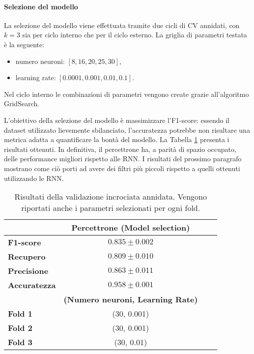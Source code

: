 \documentclass[../../main.tex]{subfiles}
\begin{document}
    \paragraph{Selezione del modello}

    La selezione del modello viene effettuata tramite due cicli di CV annidati, con $k = 3$ sia per ciclo interno che per il ciclo esterno. La griglia di parametri testata è la seguente:
    \begin{itemize}
        \item numero neuroni: $[8, 16, 20, 25, 30]$,
        \item learning rate: $[0.0001, 0.001, 0.01, 0.1]$.
    \end{itemize}

    Nel ciclo interno le combinazioni di parametri vengono create grazie all'algoritmo GridSearch.

    L'obiettivo della selezione del modello è massimizzare l'F1-score: essendo il dataset utilizzato lievemente sbilanciato, l'accuratezza potrebbe non risultare una metrica adatta a quantificare la bontà del modello. La Tabella \ref{tab:modelSelection} presenta i risultati ottenuti. In definitiva, il percettrone ha, a parità di spazio occupato, delle performance migliori rispetto alle RNN. I risultati del prossimo paragrafo mostrano come ciò porti ad avere dei filtri più piccoli rispetto a quelli ottenuti utilizzando le RNN.
    \begin{table}[H]
        \centering                  
        \begin{tabular}{lccc}
            \toprule
            {}  &   \textbf{Percettrone (Model selection)}\\
            \midrule
            \textbf{F1-score }      &    $0.835 \pm 0.002$ \\
            \textbf{Recupero   }    &    $0.809 \pm 0.010$ \\
            \textbf{Precisione }    &    $0.863 \pm 0.011$ \\
            \textbf{Accuratezza }   &    $0.958 \pm 0.001$ \\
            \midrule
            {} & \textbf{(Numero neuroni, Learning Rate)}\\
            \midrule
            \textbf{Fold 1} &   (30, 0.001)\\ 
            \textbf{Fold 2} &   (30, 0.001)\\
            \textbf{Fold 3} &   (30, 0.01)\\
            \bottomrule
        \end{tabular}
        \caption{Risultati della validazione incrociata annidata. Vengono riportati anche i parametri selezionati per ogni fold.}
        \label{tab:modelSelection}
    \end{table}
\end{document}
